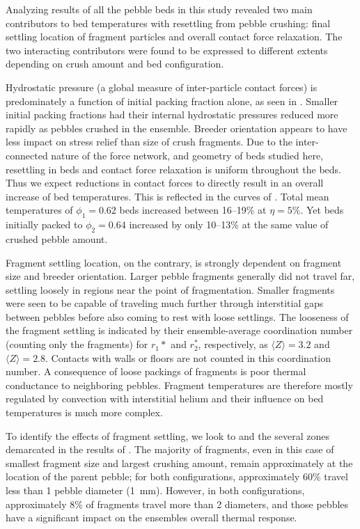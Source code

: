 Analyzing results of all the pebble beds in this study revealed two main contributors to bed temperatures with resettling from pebble crushing: final settling location of fragment particles and overall contact force relaxation. The two interacting contributors were found to be expressed to different extents depending on crush amount and bed configuration.

Hydrostatic pressure (a global measure of inter-particle contact forces) is predominately a function of initial packing fraction alone, as seen in . Smaller initial packing fractions had their internal hydrostatic pressures reduced more rapidly as pebbles crushed in the ensemble. Breeder orientation appears to have less impact on stress relief than size of crush fragments. Due to the inter-connected nature of the force network, and geometry of beds studied here, resettling in beds and contact force relaxation is uniform throughout the beds. Thus we expect reductions in contact forces to directly result in an overall increase of bed temperatures. This is reflected in the curves of . Total mean temperatures of $\phi_1 = 0.62$ beds increased between \numrange{16}{19}\% at $\eta = 5\%$. Yet beds initially packed to $\phi_2 = 0.64$ increased by only \numrange{10}{13}\% at the same value of crushed pebble amount.

Fragment settling location, on the contrary, is strongly dependent on fragment size and breeder orientation. Larger pebble fragments generally did not travel far, settling loosely in regions near the point of fragmentation. Smaller fragments were seen to be capable of traveling much further through interstitial gaps between pebbles before also coming to rest with loose settlings. The looseness of the fragment settling is indicated by their ensemble-average coordination number (counting only the fragments) for $r_1*$ and $r_2^*$, respectively, as $\langle Z \rangle = 3.2$ and $\langle Z \rangle = 2.8$. Contacts with walls or floors are not counted in this coordination number. A consequence of loose packings of fragments is poor thermal conductance to neighboring pebbles. Fragment temperatures are therefore mostly regulated by convection with interstitial helium and their influence on bed temperatures is much more complex.

To identify the effects of fragment settling, we look to  and the several zones demarcated in the results of . The majority of fragments, even in this case of smallest fragment size and largest crushing amount, remain approximately at the location of the parent pebble; for both configurations, approximately 60\% travel less than 1 pebble diameter (\SI{1}{\milli\meter}). However, in both configurations, approximately 8\% of fragments travel more than 2 diameters, and those pebbles have a significant impact on the ensembles overall thermal response.

